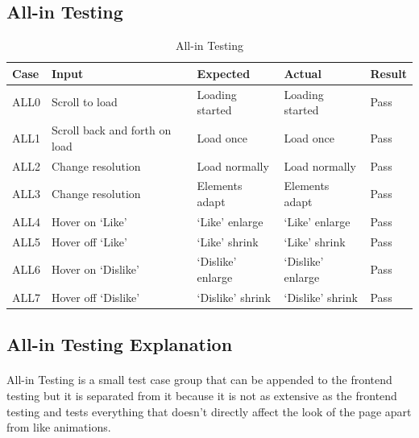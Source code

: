 \documentclass[12pt]{report}
\begin{document}
\begin{appendices}
\clearpage

\subsection*{All-in Testing}
\label{appendix:all-in_testing}

\begin{table}[ht]
  \centering
  \begin{tabular}{@{\extracolsep{1pt}}lllll}
  \toprule   
  {Case} & {Input} & {Expected} & {Actual} & {Result}\\
  \midrule
  ALL0 & Scroll to load & Loading started & Loading started & Pass\\ 
  \addlinespace[3pt]
  ALL1 & Scroll back and forth on load & Load once & Load once & Pass\\
  \addlinespace[3pt]
  ALL2 & Change resolution & Load normally & Load normally & Pass\\
  \addlinespace[3pt]
  ALL3 & Change resolution & Elements adapt & Elements adapt & Pass\\
  \addlinespace[3pt]
  ALL4 & Hover on `Like' & `Like' enlarge & `Like' enlarge & Pass\\
  \addlinespace[3pt]
  ALL5 & Hover off `Like' & `Like' shrink & `Like' shrink & Pass\\
  \addlinespace[3pt]
  ALL6 & Hover on `Dislike' & `Dislike' enlarge & `Dislike' enlarge & Pass\\
  \addlinespace[3pt]
  ALL7 & Hover off `Dislike' & `Dislike' shrink & `Dislike' shrink & Pass\\
  \bottomrule
  \end{tabular}
  \caption{All-in Testing}
\end{table}

\subsection*{All-in Testing Explanation}
\label{appendix:all-in_testing_explanation}
\paragraph{}
All-in Testing is a small test case group that can be appended to the frontend testing but it is separated from it
because it is not as extensive as the frontend testing and tests everything that doesn't directly affect the look
of the page apart from like animations.


\end{appendices}
\end{document}
